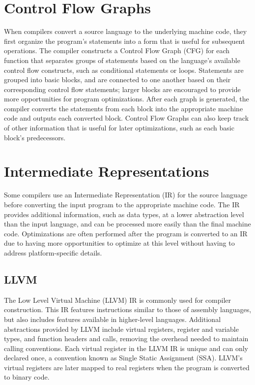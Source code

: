 \section{Control Flow Graphs}
When compilers convert a source language to the underlying machine code, they first organize the program's statements into a form that is useful for subsequent operations. The compiler constructs a Control Flow Graph (CFG) for each function that separates groups of statements based on the language's available control flow constructs, such as conditional statements or loops. Statements are grouped into basic blocks, and are connected to one another based on their corresponding control flow statements; larger blocks are encouraged to provide more opportunities for program optimizations. After each graph is generated, the compiler converts the statements from each block into the appropriate machine code and outputs each converted block. Control Flow Graphs can also keep track of other information that is useful for later optimizations, such as each basic block's predecessors.

\section{Intermediate Representations}
Some compilers use an Intermediate Representation (IR) for the source language before converting the input program to the appropriate machine code. The IR provides additional information, such as data types, at a lower abstraction level than the input language, and can be processed more easily than the final machine code. Optimizations are often performed after the program is converted to an IR due to having more opportunities to optimize at this level without having to address platform-specific details.

\subsection{LLVM}
The Low Level Virtual Machine (LLVM) IR is commonly used for compiler construction. This IR features instructions similar to those of assembly languages, but also includes features available in higher-level languages. Additional abstractions provided by LLVM include virtual registers, register and variable types, and function headers and calls, removing the overhead needed to maintain calling conventions. Each virtual register in the LLVM IR is unique and can only declared once, a convention known as Single Static Assignment (SSA). LLVM's virtual registers are later mapped to real registers when the program is converted to binary code.

